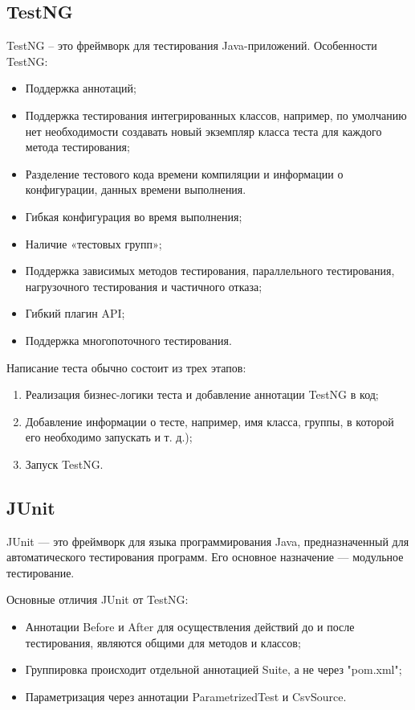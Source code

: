 \documentclass[a4paper]{article}
\begin{document}
    \subsection{TestNG}
    \noindent TestNG – это фреймворк для тестирования Java-приложений. Особенности TestNG:
    \begin{itemize}
        \item Поддержка аннотаций;
        \item Поддержка тестирования интегрированных классов, например, по умолчанию нет необходимости создавать новый экземпляр класса теста для каждого метода тестирования;
        \item Разделение тестового кода времени компиляции и информации о конфигурации, данных времени выполнения.
        \item Гибкая конфигурация во время выполнения;
        \item Наличие «тестовых групп»;
        \item Поддержка зависимых методов тестирования, параллельного тестирования, нагрузочного тестирования и частичного отказа;
        \item Гибкий плагин API;
        \item Поддержка многопоточного тестирования.
    \end{itemize}
    \noindent Написание теста обычно состоит из трех этапов:
    \begin{enumerate}
        \item Реализация бизнес-логики теста и добавление аннотации TestNG в код;
        \item Добавление информации о тесте, например, имя класса, группы, в которой его необходимо запускать и т. д.);
        \item Запуск TestNG.
    \end{enumerate}
    \subsection{JUnit}
    JUnit — это фреймворк для языка программирования Java, предназначенный для автоматического тестирования программ. Его основное назначение — модульное тестирование. \par
    Основные отличия JUnit от TestNG:
    \begin{itemize}
        \item Аннотации Before и After для осуществления действий до и после тестирования, являются общими для методов и классов;
        \item Группировка происходит отдельной аннотацией Suite, а не через "pom.xml";
        \item Параметризация через аннотации ParametrizedTest и CsvSource.
    \end{itemize}
\end{document}
